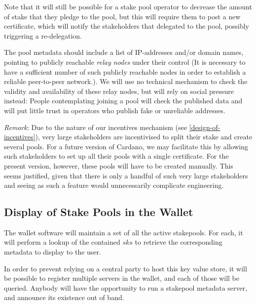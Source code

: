 \documentclass[11pt,a4paper]{article}
\begin{document}
Note that it will still be possible for a stake pool operator to
decrease the amount of stake that they pledge to the pool, but this will
require them to post a new certificate, which will notify the
stakeholders that delegated to the pool, possibly triggering a
re-delegation.

The pool metadata should include a list of IP-addresses and/or domain
names, pointing to publicly reachable \emph{relay nodes} under their
control (It is necessary to have a sufficient number of such publicly
reachable nodes in order to establish a reliable peer-to-peer
network.). We will use no technical mechanism to check the validity
and availability of these relay nodes, but will rely on social
pressure instead: People contemplating joining a pool will check the
published data and will put little trust in operators who publish fake
or unreliable addresses.

\emph{Remark}: Due to the nature of our incentives mechanism (see
\cref{design-of-incentives}), very large stakeholders are
incentivised to split their stake and create several pools. For a future
version of Cardano, we may facilitate this by allowing such
stakeholders to set up all their pools with a single certificate. For
the present version, however, these pools will have to be created
manually. This seems justified, given that there is only a handful of
such very large stakeholders and seeing as such a feature would
unnecessarily complicate engineering.

\subsection{Display of Stake Pools in the Wallet}
\label{display-of-stake-pools-in-the-wallet}

The wallet software will maintain a set of all the active stakepools. For each,
it will perform a lookup of the contained \(sks\) to retrieve the corresponding
metadata to display to the user.

In order to prevent relying on a central party to host this key value
store, it will be possible to register multiple servers in the wallet,
and each of those will be queried. Anybody will have the opportunity to
run a stakepool metadata server, and announce its existence out of
band.
\end{document}
